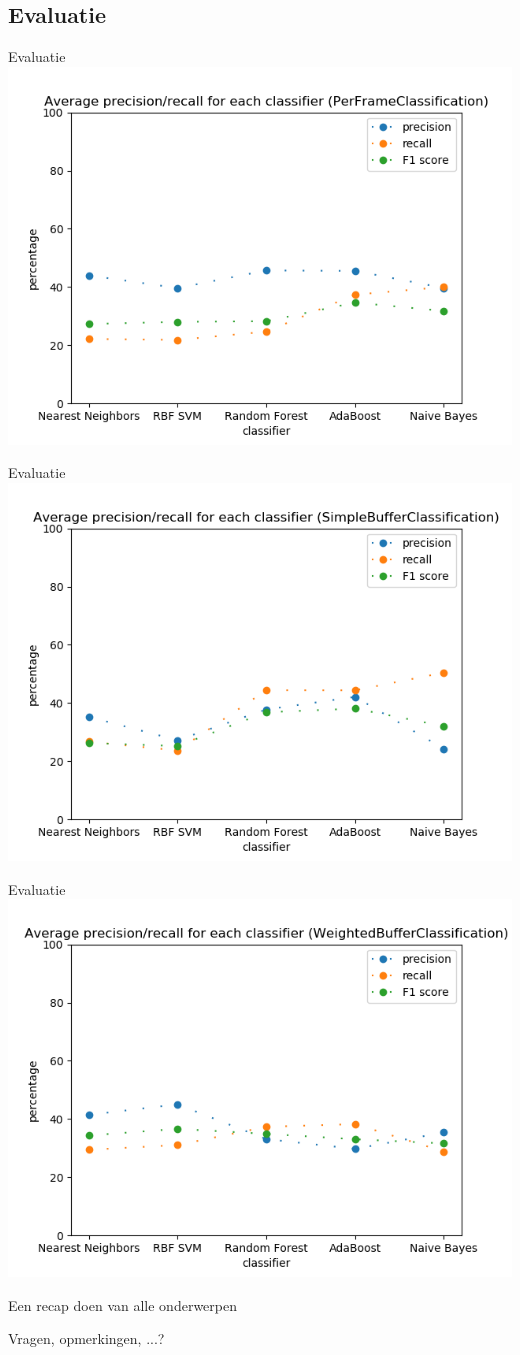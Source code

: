 \documentclass[]{beamer}
\begin{document}
	\subsection{Evaluatie}
	\begin{frame}{Evaluatie}
		\centering
		\includegraphics[width=0.8\linewidth]{PerFrameClassification_PreProcessing}
	\end{frame}
	\begin{frame}{Evaluatie}
		\centering
		\includegraphics[width=0.8\linewidth]{SimpleBufferClassification_PreProcessing}
	\end{frame}
	\begin{frame}{Evaluatie}
		\centering
		\includegraphics[width=0.8\linewidth]{WeightedBufferClassification_PreProcessing}
	\end{frame}
	
	
	\begin{frame}
	Een recap doen van alle onderwerpen
\end{frame}
	\begin{frame}
		\begin{center}
			\Huge Vragen, opmerkingen, ...?
		\end{center}
	\end{frame}
\end{document}

